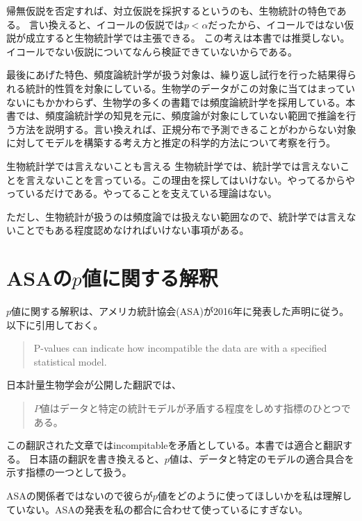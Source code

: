 
帰無仮説を否定すれば、対立仮説を採択するというのも、生物統計の特色である。
言い換えると、イコールの仮説では$p<\alpha$だったから、イコールではない仮説が成立すると生物統計学では主張できる。
この考えは本書では推奨しない。
イコールでない仮説についてなんら検証できていないからである。


最後にあげた特色、頻度論統計学が扱う対象は、繰り返し試行を行った結果得られる統計的性質を対象にしている。生物学のデータがこの対象に当てはまっていないにもかかわらず、生物学の多くの書籍では頻度論統計学を採用している。本書では、頻度論統計学の知見を元に、頻度論が対象にしていない範囲で推論を行う方法を説明する。言い換えれば、正規分布で予測できることがわからない対象に対してモデルを構築する考え方と推定の科学的方法について考察を行う。

\begin{SMbox}{生物統計学では言えないことも言える}
    生物統計学では、統計学では言えないことを言えないことを言っている。この理由を探してはいけない。やってるからやっているだけである。やってることを支えている理論はない。
    
    ただし、生物統計が扱うのは頻度論では扱えない範囲なので、統計学では言えないことでもある程度認めなければいけない事項がある。
\end{SMbox}

\section{ASAの$p$値に関する解釈}
$p$値に関する解釈は、アメリカ統計協会(ASA)が2016年に発表した声明に従う\cite{doi:10.1080/00031305.2016.1154108}。以下に引用しておく。
\begin{quote}
    P-values can indicate how incompatible the data are with a specified statistical model.
\end{quote}
日本計量生物学会が公開した翻訳では、
\begin{quote}
    $P$値はデータと特定の統計モデルが矛盾する程度をしめす指標のひとつである。
\end{quote}
この翻訳された文章ではincompitableを矛盾としている。本書では適合と翻訳する。
日本語の翻訳を書き換えると、$p$値は、データと特定のモデルの適合具合を示す指標の一つとして扱う。


ASAの関係者ではないので彼らが$p$値をどのように使ってほしいかを私は理解していない。ASAの発表を私の都合に合わせて使っているにすぎない。

